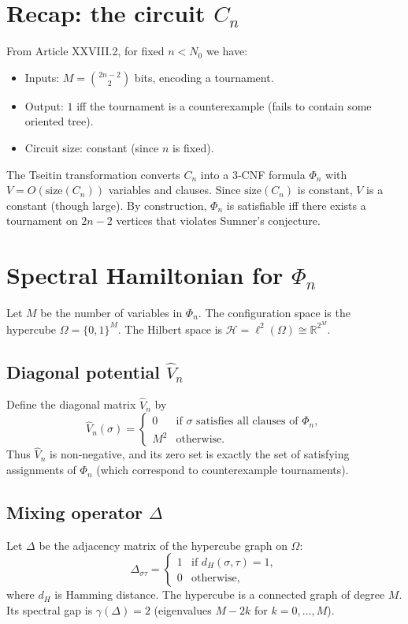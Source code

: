 \documentclass[11pt,a4paper]{article}
\begin{document}
\section{Recap: the circuit $C_n$}
From Article XXVIII.2, for fixed $n < N_0$ we have:
\begin{itemize}
\item Inputs: $M = \binom{2n-2}{2}$ bits, encoding a tournament.
\item Output: $1$ iff the tournament is a counterexample (fails to contain some oriented tree).
\item Circuit size: constant (since $n$ is fixed).
\end{itemize}
The Tseitin transformation converts $C_n$ into a 3‑CNF formula $\Phi_n$ with $V = O(\text{size}(C_n))$ variables and clauses. Since $\text{size}(C_n)$ is constant, $V$ is a constant (though large). By construction, $\Phi_n$ is satisfiable iff there exists a tournament on $2n-2$ vertices that violates Sumner's conjecture.

\section{Spectral Hamiltonian for $\Phi_n$}
Let $M$ be the number of variables in $\Phi_n$. The configuration space is the hypercube $\Omega = \{0,1\}^M$. The Hilbert space is $\mathcal{H} = \ell^2(\Omega) \cong \mathbb{R}^{2^M}$.

\subsection{Diagonal potential $\hat{V}_n$}
Define the diagonal matrix $\hat{V}_n$ by
\[
\hat{V}_n(\sigma) = \begin{cases}
0 & \text{if }\sigma\text{ satisfies all clauses of } \Phi_n,\\
M^2 & \text{otherwise}.
\end{cases}
\]
Thus $\hat{V}_n$ is non‑negative, and its zero set is exactly the set of satisfying assignments of $\Phi_n$ (which correspond to counterexample tournaments).

\subsection{Mixing operator $\Delta$}
Let $\Delta$ be the adjacency matrix of the hypercube graph on $\Omega$:
\[
\Delta_{\sigma\tau} = \begin{cases}
1 & \text{if } d_H(\sigma,\tau)=1,\\
0 & \text{otherwise},
\end{cases}
\]
where $d_H$ is Hamming distance. The hypercube is a connected graph of degree $M$. Its spectral gap is $\gamma(\Delta)=2$ (eigenvalues $M-2k$ for $k=0,\dots,M$).
\end{document}
